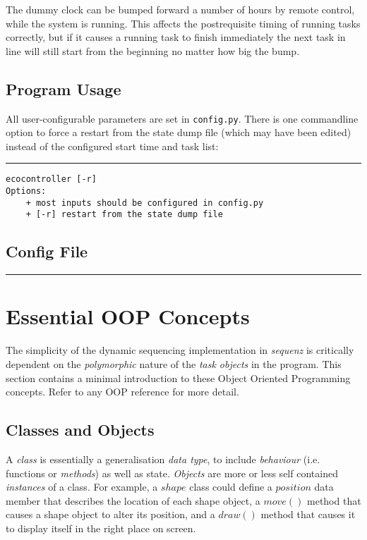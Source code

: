 \documentclass[11pt,a4paper]{article}
\begin{document}
The dummy clock can be bumped forward a number of hours by remote
control, while the system is running. This affects the postrequisite
timing of running tasks correctly, but if it causes a running task to
finish immediately the next task in line will still start from the
beginning no matter how big the bump.


\subsection{Program Usage}

All user-configurable parameters are set in \verb#config.py#. There is
one commandline option to force a restart from the state dump file
(which may have been edited) instead of the configured start time and
task list:

\lstset{language=sh}

{\small

\noindent
\rule{5cm}{.2mm}
\begin{lstlisting}
ecocontroller [-r]
Options:
    + most inputs should be configured in config.py
    + [-r] restart from the state dump file
\end{lstlisting}
}

\lstset{language=Python}

\subsection{Config File}

{\small
\noindent
\rule{5cm}{.2mm}

}

\appendix

\section{Essential OOP Concepts}

The simplicity of the dynamic sequencing implementation in {\em sequenz}
is critically dependent on the {\em polymorphic} nature of the {\em task
objects} in the program.  This section contains a minimal introduction
to these Object Oriented Programming concepts.  Refer to any OOP
reference for more detail.

\subsection{Classes and Objects}

A {\em class} is essentially a generalisation {\em data type}, to
include {\em behaviour} (i.e. functions or {\em methods}) as well as
state.  {\em Objects} are more or less self contained {\em instances} of
a class. For example, a $shape$ class could define a $position$ data
member that describes the location of each shape object, a $move()$
method that causes a shape object to alter its position, and a $draw()$
method that causes it to display itself in the right place on screen.
\end{document}
